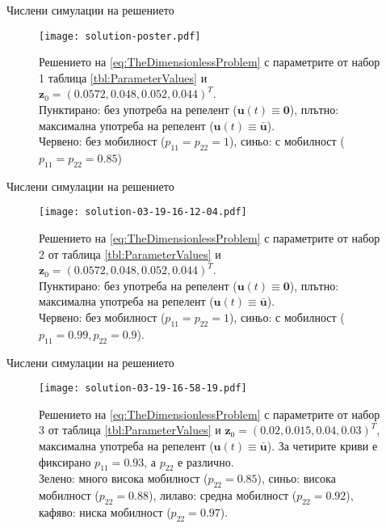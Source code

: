 \begin{frame}[t]{Числени симулации на решението}
  \begin{figure}[h]
    \centering
    \texttt{[image: solution-poster.pdf]}
    \caption{Решението на \eqref{eq:TheDimensionlessProblem} с параметрите от набор 1 таблица \ref{tbl:ParameterValues} и $\mathbf{z}_0=(0.0572, 0.048, 0.052, 0.044)^T$.\\
      Пунктирано: без употреба на репелент ($\mathbf{u}(t) \equiv \mathbf{0}$), плътно: максимална употреба на репелент ($\mathbf{u}(t) \equiv \bar{\mathbf{u}}$).\\
    Червено: без мобилност ($p_{11}=p_{22}=1$), синьо: с мобилност ($p_{11}=p_{22}=0.85$)}
    \label{fig:Solution-poster}
  \end{figure}
\end{frame}

\begin{frame}[t]{Числени симулации на решението}
  \begin{figure}[h]
    \centering
    \texttt{[image: solution-03-19-16-12-04.pdf]}
    \caption{Решението на \eqref{eq:TheDimensionlessProblem} с параметрите от набор 2 от таблица \ref{tbl:ParameterValues} и $\mathbf{z}_0=(0.0572, 0.048, 0.052, 0.044)^T$.\\
      Пунктирано: без употреба на репелент ($\mathbf{u}(t) \equiv \mathbf{0}$), плътно: максимална употреба на репелент ($\mathbf{u}(t) \equiv \bar{\mathbf{u}}$).\\
    Червено: без мобилност ($p_{11}=p_{22}=1$), синьо: с мобилност ($p_{11}=0.99, p_{22}=0.9$).}
    \label{fig:Solution-03-19-16-12-04}
  \end{figure}
\end{frame}

\begin{frame}[t]{Числени симулации на решението}
  \begin{figure}[h]
    \centering
    \texttt{[image: solution-03-19-16-58-19.pdf]}
    \caption{Решението на \eqref{eq:TheDimensionlessProblem} с параметрите от набор 3 от таблица \ref{tbl:ParameterValues} и $\mathbf{z}_0=(0.02, 0.015, 0.04, 0.03)^T$, максимална употреба на репелент ($\mathbf{u}(t) \equiv \bar{\mathbf{u}}$).
      За четирите криви е фиксирано $p_{11}=0.93$, а $p_{22}$ е различно.\\
    Зелено: много висока мобилност ($p_{22}=0.85$), синьо: висока мобилност ($p_{22}=0.88$), лилаво: средна мобилност ($p_{22}=0.92$), кафяво: ниска мобилност ($p_{22}=0.97$).}
    \label{fig:Solution-03-19-16-58-19}
  \end{figure}
\end{frame}
